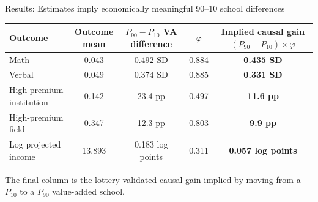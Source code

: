 \documentclass[11pt,aspectratio=169]{beamer}
\begin{document}
\begin{frame}{Results: Estimates imply economically meaningful 90--10 school differences}
\centering
\scriptsize
\setlength{\tabcolsep}{5pt}
\renewcommand{\arraystretch}{1.35}
\begin{tabular}{lcccc}
\toprule
Outcome
& \shortstack{Outcome\\mean}
& \shortstack{$P_{90}-P_{10}$\\VA difference}
& $\varphi$
& \shortstack{Implied causal gain\\$(P_{90}-P_{10})\times\varphi$} \\
\midrule
Math & 0.043 & 0.492 SD & 0.884 & \textbf{0.435 SD} \\
Verbal & 0.049 & 0.374 SD & 0.885 & \textbf{0.331 SD} \\
High-premium institution & 0.142 & 23.4 pp & 0.497 & \textbf{11.6 pp} \\
High-premium field & 0.347 & 12.3 pp & 0.803 & \textbf{9.9 pp} \\
Log projected income & 13.893 & 0.183 log points & 0.311 & \textbf{0.057 log points} \\
\bottomrule
\end{tabular}

\vspace{0.9em}
\footnotesize
The final column is the lottery-validated causal gain implied by moving from a $P_{10}$ to a $P_{90}$ value-added school.



\end{frame}
\end{document}
